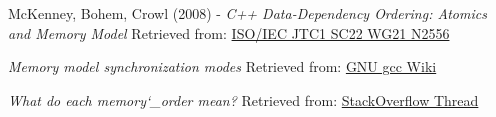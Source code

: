     McKenney, Bohem, Crowl (2008) - \emph{C++ Data-Dependency Ordering: Atomics and Memory Model}
    \newline
    Retrieved from: \href{https://www.open-std.org/jtc1/sc22/wg21/docs/papers/2008/n2556.html}{ISO/IEC JTC1 SC22 WG21 N2556}

    \emph{Memory model synchronization modes}
    \newline
    Retrieved from: \href{http://gcc.gnu.org/wiki/Atomic/GCCMM/AtomicSync}{GNU gcc Wiki}

    \emph{What do each memory\char`_order mean?}
    \newline
    Retrieved from: \href{https://stackoverflow.com/questions/12346487/what-do-each-memory-order-mean}{StackOverflow Thread}
